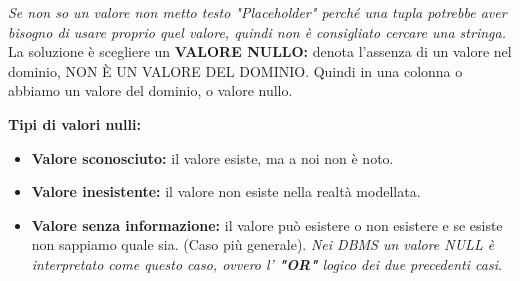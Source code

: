 \documentclass{article}
\begin{document}
\textit{Se non so un valore non metto testo "Placeholder" perché una tupla potrebbe aver bisogno di usare proprio quel valore, quindi non è consigliato cercare una stringa.} La soluzione è scegliere un \textbf{VALORE NULLO:} denota l'assenza di un valore nel dominio, NON È UN VALORE DEL DOMINIO. Quindi in una colonna o abbiamo un valore del dominio, o valore nullo.

\textbf{Tipi di valori nulli:}
\begin{itemize}
    \item \textbf{Valore sconosciuto:} il valore esiste, ma a noi non è noto.
    \item \textbf{Valore inesistente:} il valore non esiste nella realtà modellata.
    \item \textbf{Valore senza informazione:} il valore può esistere o non esistere e se esiste non sappiamo quale sia. (Caso più generale). \textit{Nei DBMS un valore NULL è interpretato come questo caso, ovvero l' \textbf{"OR"} logico dei due precedenti casi}.
\end{itemize}
\end{document}
